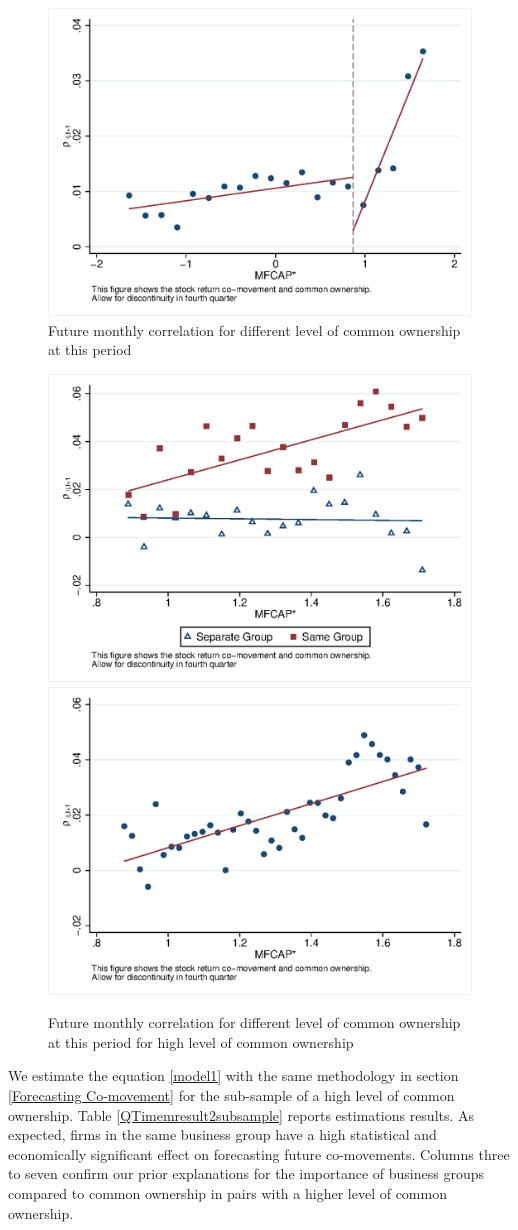 			\begin{figure}[htbp]
				\centering  
				\includegraphics[width=0.6\linewidth]{"Output/Qmcorr5lrd.eps"}
				\caption{Future monthly correlation for different level of common ownership at this period}
				\label{Qmcorr5lrd}
			\end{figure}
			\begin{figure}[htbp]
				\centering  
				\includegraphics[width=0.45\linewidth]{"Output/Qmcorr5lrdbgsubsample.eps"}
				\includegraphics[width=0.45\linewidth]{"Output/Qmcorr5subsample.eps"}
				\caption{Future monthly correlation for different level of common ownership at this period for high level of common ownership}
				\label{Qmcorr5subsample}
			\end{figure}
			
			
			We estimate the equation \ref{model1} with the same methodology in section \ref{Forecasting Co-movement}  for the sub-sample of a high level of common ownership. Table \ref{QTimemresult2subsample} reports estimations results. As expected, firms in the same business group have a high statistical and economically significant effect on forecasting future co-movements. Columns three to seven confirm our prior explanations for the importance of business groups compared to common ownership in pairs with a higher level of common ownership. 
			
